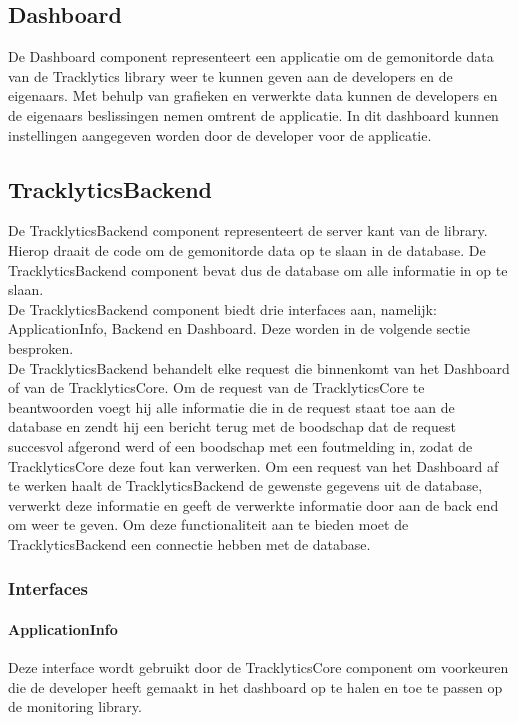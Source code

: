 \subsection{Dashboard}
De Dashboard component representeert een applicatie om de gemonitorde data van de Tracklytics library weer te kunnen geven aan de developers en de eigenaars. Met behulp van grafieken en verwerkte data kunnen de developers en de eigenaars beslissingen nemen omtrent de applicatie. In dit dashboard kunnen instellingen aangegeven worden door de developer voor de applicatie. \\

\subsection{TracklyticsBackend}
De TracklyticsBackend component representeert de server kant van de library. Hierop draait de code om de gemonitorde data op te slaan in de database. De TracklyticsBackend component bevat dus de database om alle informatie in op te slaan. \\
De TracklyticsBackend component biedt drie interfaces aan, namelijk: ApplicationInfo, Backend en Dashboard. Deze worden in de volgende sectie besproken.\\

De TracklyticsBackend behandelt elke request die binnenkomt van het Dashboard of van de TracklyticsCore. Om de request van de TracklyticsCore te beantwoorden voegt hij alle informatie die in de request staat toe aan de database en zendt hij een bericht terug met de boodschap dat de request succesvol afgerond werd of een boodschap met een foutmelding in, zodat de TracklyticsCore deze fout kan verwerken. Om een request van het Dashboard af te werken haalt de TracklyticsBackend de gewenste gegevens uit de database, verwerkt deze informatie en geeft de verwerkte informatie door aan de back end om weer te geven. Om deze functionaliteit aan te bieden moet de TracklyticsBackend een connectie hebben met de database. 



\subsubsection{Interfaces}
\paragraph{ApplicationInfo}
Deze interface wordt gebruikt door de TracklyticsCore component om voorkeuren die de developer heeft gemaakt in het dashboard op te halen en toe te passen op de monitoring library.

